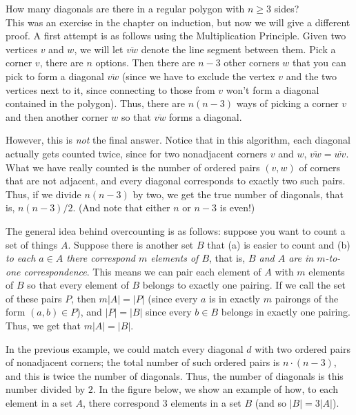 \documentclass[11pt,dvipsnames]{book}
\numberwithin{equation}{section} %
\numberwithin{figure}{section} %
\numberwithin{table}{section} %
\begin{document}
\begin{example}
How many diagonals are there in a regular polygon with $n \geq 3$ sides?\\

This was an exercise in the chapter on induction, but now we will give a different proof. A first attempt is as follows using the Multiplication Principle. Given two vertices $v$ and $w$, we will let $\overline{vw}$ denote the line segment between them. Pick a corner $v$, there are $n$ options. Then there are $n-3$ other corners $w$ that you can pick to form a diagonal $\overline{vw}$ (since we have to exclude the vertex $v$ and the two vertices next to it, since connecting to those from $v$ won't form a diagonal contained in the polygon). Thus, there are $n(n-3)$ ways of picking a corner $v$ and then another corner $w$ so that $\overline{vw}$ forms a diagonal.

However, this is {\it not} the final answer. Notice that in this algorithm, each diagonal actually gets counted twice, since for two nonadjacent corners $v$ and $w$, $\overline{vw}=\overline{wv}$. What we have really counted is the number of ordered pairs $(v,w)$ of corners that are not adjacent, and every diagonal corresponds to exactly two such pairs. Thus, if we divide $n(n-3)$ by two, we get the true number of diagonals, that is, $n(n-3)/2$. (And note that either $n$ or $n-3$ is even!)
\end{example}


The general idea behind overcounting is as follows: suppose you want to count a set of things $A$. Suppose there is another set $B$ that (a) is easier to count and (b) {\it to each $a\in A$ there correspond $m$ elements of $B$}, that is, {\it $B$ and $A$ are in $m$-to-one correspondence}. This means we can pair each element of $A$ with $m$ elements of $B$ so that every element of $B$ belongs to exactly one pairing. If we call the set of these pairs $P$, then $m|A|=|P|$ (since every $a$ is in exactly $m$ pairongs of the form $(a,b)\in P$), and $|P|=|B|$ since every $b\in B$ belongs in exactly one pairing. Thus, we get that $m|A|=|B|$.

In the previous example, we could match every diagonal $d$ with two ordered pairs of nonadjacent corners; the total number of such ordered pairs is $n\cdot (n-3)$, and this is twice the number of diagonals. Thus, the number of diagonals is this number divided by $2$. In the figure below, we show an example of how, to each element in a set $A$, there correspond 3 elements in a set $B$ (and so $|B|=3|A|$).
\end{document}
